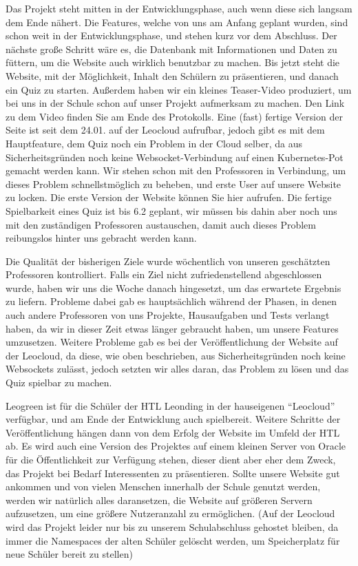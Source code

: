 Das Projekt steht mitten in der Entwicklungsphase, auch wenn diese sich langsam dem Ende nähert. Die Features, welche von uns am Anfang geplant wurden, sind schon weit in der Entwicklungsphase, und stehen kurz vor dem Abschluss. Der nächste große Schritt wäre es, die Datenbank mit Informationen und Daten zu füttern, um die Website auch wirklich benutzbar zu machen. Bis jetzt steht die Website, mit der Möglichkeit, Inhalt den Schülern zu präsentieren, und danach ein Quiz zu starten. Außerdem haben wir ein kleines Teaser-Video produziert, um bei uns in der Schule schon auf unser Projekt aufmerksam zu machen. Den Link zu dem Video finden Sie am Ende des Protokolls. Eine (fast) fertige Version der Seite ist seit dem 24.01. auf der Leocloud aufrufbar, jedoch gibt es mit dem Hauptfeature, dem Quiz noch ein Problem in der Cloud selber, da aus Sicherheitsgründen noch keine Websocket-Verbindung auf einen Kubernetes-Pot gemacht werden kann. Wir stehen schon mit den Professoren in Verbindung, um dieses Problem schnellstmöglich zu beheben, und erste User auf unsere Website zu locken. Die erste Version der Website können Sie hier aufrufen. Die fertige Spielbarkeit eines Quiz ist bis 6.2 geplant, wir müssen bis dahin aber noch uns mit den zuständigen Professoren austauschen, damit auch dieses Problem reibungslos hinter uns gebracht werden kann.  

 

Die Qualität der bisherigen Ziele wurde wöchentlich von unseren geschätzten Professoren kontrolliert. Falls ein Ziel nicht zufriedenstellend abgeschlossen wurde, haben wir uns die Woche danach hingesetzt, um das erwartete Ergebnis zu liefern. Probleme dabei gab es hauptsächlich während der Phasen, in denen auch andere Professoren von uns Projekte, Hausaufgaben und Tests verlangt haben, da wir in dieser Zeit etwas länger gebraucht haben, um unsere Features umzusetzen. Weitere Probleme gab es bei der Veröffentlichung der Website auf der Leocloud, da diese, wie oben beschrieben, aus Sicherheitsgründen noch keine Websockets zulässt, jedoch setzten wir alles daran, das Problem zu lösen und das Quiz spielbar zu machen. 

  

  

Leogreen ist für die Schüler der HTL Leonding in der hauseigenen “Leocloud” verfügbar, und am Ende der Entwicklung auch spielbereit. Weitere Schritte der Veröffentlichung hängen dann von dem Erfolg der Website im Umfeld der HTL ab. Es wird auch eine Version des Projektes auf einem kleinen Server von Oracle für die Öffentlichkeit zur Verfügung stehen, dieser dient aber eher dem Zweck, das Projekt bei Bedarf Interessenten zu präsentieren. Sollte unsere Website gut ankommen und von vielen Menschen innerhalb der Schule genutzt werden, werden wir natürlich alles daransetzen, die Website auf größeren Servern aufzusetzen, um eine größere Nutzeranzahl zu ermöglichen. (Auf der Leocloud wird das Projekt leider nur bis zu unserem Schulabschluss gehostet bleiben, da immer die Namespaces der alten Schüler gelöscht werden, um Speicherplatz für neue Schüler bereit zu stellen) 

